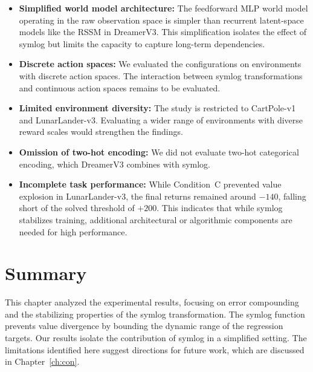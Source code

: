 \begin{itemize}
    \item \textbf{Simplified world model architecture:} The feedforward MLP world model operating in the raw observation space is simpler than recurrent latent-space models like the RSSM in DreamerV3. This simplification isolates the effect of symlog but limits the capacity to capture long-term dependencies.
    \item \textbf{Discrete action spaces:} We evaluated the configurations on environments with discrete action spaces. The interaction between symlog transformations and continuous action spaces remains to be evaluated.
    \item \textbf{Limited environment diversity:} The study is restricted to CartPole-v1 and LunarLander-v3. Evaluating a wider range of environments with diverse reward scales would strengthen the findings.
    \item \textbf{Omission of two-hot encoding:} We did not evaluate two-hot categorical encoding, which DreamerV3 combines with symlog.
    \item \textbf{Incomplete task performance:} While Condition~C prevented value explosion in LunarLander-v3, the final returns remained around $-140$, falling short of the solved threshold of $+200$. This indicates that while symlog stabilizes training, additional architectural or algorithmic components are needed for high performance.
\end{itemize}

\section{Summary}

This chapter analyzed the experimental results, focusing on error compounding and the stabilizing properties of the symlog transformation. The symlog function prevents value divergence by bounding the dynamic range of the regression targets. Our results isolate the contribution of symlog in a simplified setting. The limitations identified here suggest directions for future work, which are discussed in Chapter~\ref{ch:con}.